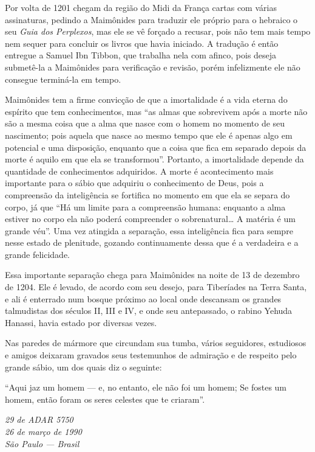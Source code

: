 Por volta de 1201 chegam da região do Midi da França cartas com várias
assinaturas, pedindo a Maimônides para traduzir ele próprio para o
hebraico o seu \emph{Guia dos Perplexos}, mas ele se vê forçado a
recusar, pois não tem mais tempo nem sequer para concluir os livros que
havia iniciado. A tradução é então entregue a Samuel Ibn Tibbon, que
trabalha nela com afinco, pois deseja submetê-la a Maimônides para
verificação e revisão, porém infelizmente ele não consegue terminá-la em
tempo.

Maimônides tem a firme convicção de que a imortalidade é a vida eterna
do espírito que tem conhecimentos, mas ``as almas que sobrevivem após a
morte não são a mesma coisa que a alma que nasce com o homem no momento
de seu nascimento; pois aquela que nasce ao mesmo tempo que ele é apenas
algo em potencial e uma disposição, enquanto que a coisa que fica em
separado depois da morte é aquilo em que ela se transformou''. Portanto,
a imortalidade depende da quantidade de conhecimentos adquiridos. A
morte é acontecimento mais importante para o sábio que adquiriu o
conhecimento de Deus, pois a compreensão da inteligência se fortifica no
momento em que ela se separa do corpo, já que ``Há um limite para a
compreensão humana: enquanto a alma estiver no corpo ela não poderá
compreender o sobrenatural\ldots{} A matéria é um grande véu''. Uma vez
atingida a separação, essa inteligência fica para sempre nesse estado
de plenitude, gozando continuamente dessa que é a verdadeira e a grande
felicidade.

Essa importante separação chega para Maimônides na noite
de 13 de dezembro de 1204. Ele é levado, de acordo
com seu desejo, para Tiberíades na Terra Santa, e ali é enterrado num
bosque próximo ao local onde descansam os grandes talmudistas dos
séculos II, III e IV, e onde seu antepassado, o rabino Yehuda Hanassi,
havia estado por diversas vezes.

Nas paredes de mármore que circundam sua tumba, vários seguidores,
estudiosos e amigos deixaram gravados seus testemunhos de admiração e de
respeito pelo grande sábio, um dos quais diz o seguinte:

``Aqui jaz um homem --- e, no entanto, ele não foi um homem; Se fostes
um homem, então foram os seres celestes que te criaram''.

\begin{flushright}
\emph{29 de ADAR 5750\\
26 de março de 1990\\
São Paulo --- Brasil}
\end{flushright}

